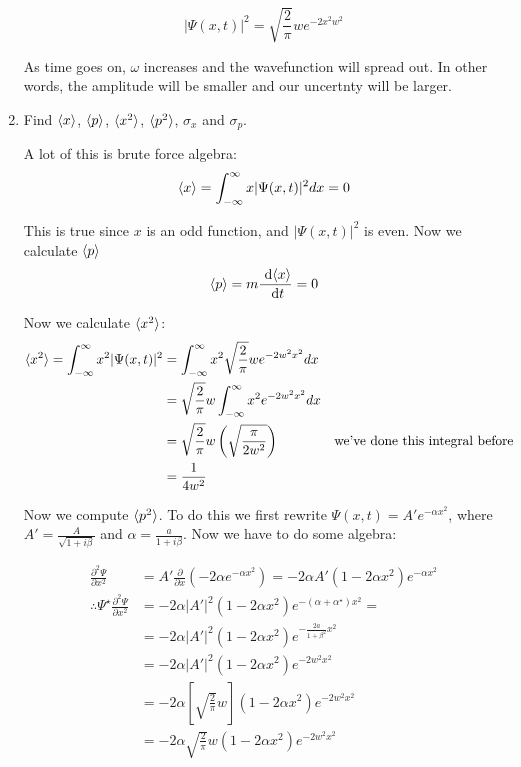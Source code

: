 \documentclass{article}
\begin{document}
\begin{enumerate}[label=(\alph*)]
\begin{solution}
        \[ |\Psi(x, t)|^2 = \sqrt{\frac{2}{\pi}} w e^{-2x^2w^2}\]

        As time goes on, $\omega$ increases and the wavefunction will spread out. In other words, the amplitude will be smaller and our uncertnty will be larger. 

    \end{solution}
    \item Find $\langle x \rangle$, $\langle p \rangle$, $\langle x^2 \rangle$, $\langle p^2 \rangle$, $\sigma_x$ and $\sigma_p$.

    \begin{solution}
        A lot of this is brute force algebra:
        \[ \langle x \rangle = \int_{-\infty}^{\infty} x |\Psi(x,t)|^2dx = 0\]

        This is true since $x$ is an odd function, and $|\Psi(x, t)|^2$ is even. Now we calculate $\langle p \rangle$
        \[ \langle p \rangle = m\frac{\ \mathrm d\langle x \rangle}{\ \mathrm d t} = 0\]

        Now we calculate $\langle x^2 \rangle$:
        \begin{align*}
          \langle x^2 \rangle = \int_{-\infty}^{\infty} x^2|\Psi(x,t)|^2 &= \int_{-\infty}^{\infty} x^2\sqrt{\frac{2}{\pi}}we^{-2w^2x^2}dx\\
          &= \sqrt{\frac{2}{\pi}}w\int_{-\infty}^{\infty} x^2e^{-2w^2x^2}dx \\
          &= \sqrt{\frac{2}{\pi}}w\left(\sqrt{\frac{\pi}{2w^2}}\right) && \text{we've done this integral before}\\
          &= \frac{1}{4w^2}
        \end{align*}


        Now we compute $\langle p^2 \rangle$. To do this we first rewrite $\Psi(x,t) = A'e^{-\alpha x^2}$, where $A' = \frac{A}{\sqrt{1 + i\beta}}$ and $\alpha = \frac{a}{1+i\beta}$. Now we have to do some algebra:


        \begin{align*}
          \frac{\partial^2\Psi}{\partial x^2} &= A'\frac{\partial}{\partial x}\left(-2\alpha e^{-\alpha x^2}\right) = -2\alpha A'(1 - 2\alpha x^2)e^{-\alpha x^2}\\
          \therefore \Psi^\star\frac{\partial^2 \Psi}{\partial x^2} &= -2\alpha|A'|^2(1-2\alpha x^2)e^{-(\alpha + \alpha^{\star})x^2} = \\
          &= -2\alpha|A'|^2(1 - 2\alpha x^2)e^{-\frac{2a}{1+\beta^2}x^2}\\
          &= -2\alpha|A'|^2(1 - 2\alpha x^2)e^{-2w^2x^2}\\
          &= -2\alpha\left[\sqrt{\frac{2}{\pi}}w\right](1 - 2\alpha x^2)e^{-2w^2x^2}\\
          &= -2\alpha\sqrt{\frac{2}{\pi}}w(1 - 2\alpha x^2)e^{-2w^2x^2}
        \end{align*}



\end{solution}
\end{enumerate}
\end{document}
